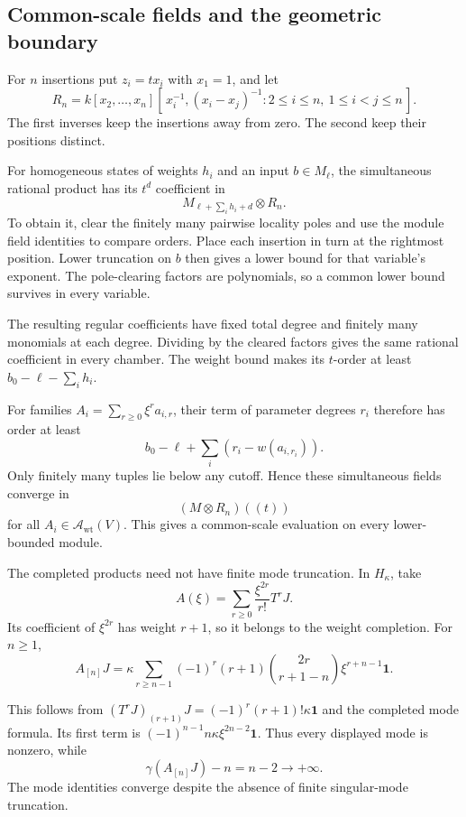 \subsection{Common-scale fields and the geometric boundary}

For \(n\) insertions put \(z_i=tx_i\)
with \(x_1=1\), and let
\[
 R_n=k[x_2,\ldots,x_n]
          [\,x_i^{-1},(x_i-x_j)^{-1}:
                    2\leq i\leq n,\ 1\leq i<j\leq n\,].
\]
The first inverses keep the insertions
away from zero. The second keep their
positions distinct.

For homogeneous states of weights \(h_i\)
and an input \(b\in M_\ell\), the
simultaneous rational product has its
\(t^d\) coefficient in
\[
                         M_{\ell+\sum_i h_i+d}\otimes R_n.
\]
To obtain it, clear the finitely many
pairwise locality poles and use the
module field identities to compare orders.
Place each insertion in turn at the
rightmost position. Lower truncation
on \(b\) then gives a lower bound for
that variable's exponent.
The pole-clearing factors are polynomials,
so a common lower bound survives in
every variable.

The resulting regular coefficients have
fixed total degree and finitely many
monomials at each degree.
Dividing by the cleared factors gives
the same rational coefficient in every
chamber. The weight bound makes its
\(t\)-order at least \(b_0-\ell-\sum_i h_i\).

For families \(A_i=\sum_{r\geq0}\xi^ra_{i,r}\),
their term of parameter degrees \(r_i\)
therefore has order at least
\[
                 b_0-\ell+\sum_i(r_i-w(a_{i,r_i})).
\]
Only finitely many tuples lie below
any cutoff. Hence these simultaneous
fields converge in
\[
                                  (M\otimes R_n)((t))
\]
for all \(A_i\in\mathscr A_{\mathrm{wt}}(V)\).
This gives a common-scale evaluation
on every lower-bounded module.

The completed products need not have
finite mode truncation. In \(H_\kappa\),
take
\[
                         A(\xi)=\sum_{r\geq0}\frac{\xi^{2r}}{r!}T^rJ.
\]
Its coefficient of \(\xi^{2r}\)
has weight \(r+1\), so it belongs
to the weight completion.
For \(n\geq1\),
\begin{equation}\label{v4-eq:singular-infinite-current-modes}
 A_{[n]}J
    =\kappa\sum_{r\geq n-1}(-1)^r(r+1)
                  \binom{2r}{r+1-n}\xi^{r+n-1}\mathbf1.
\end{equation}

This follows from
\((T^rJ)_{(r+1)}J=(-1)^r(r+1)!\kappa\mathbf1\)
and the completed mode formula.
Its first term is
\((-1)^{n-1}n\kappa\xi^{2n-2}\mathbf1\).
Thus every displayed mode is nonzero, while
\[
                         \gamma(A_{[n]}J)-n=n-2\longrightarrow+\infty.
\]
The mode identities converge despite
the absence of finite singular-mode truncation.

